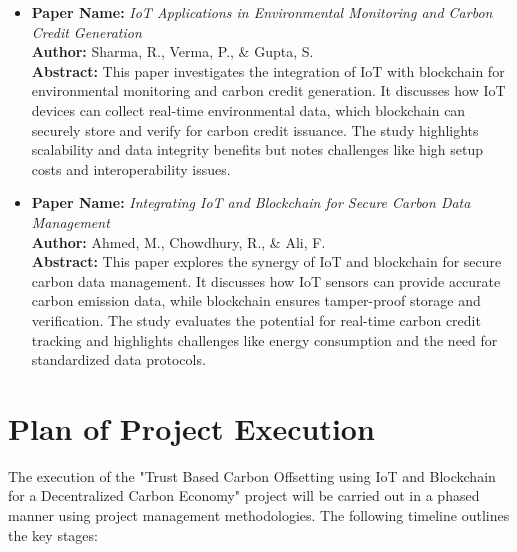 \documentclass[oneside,a4paper,12pt]{book}
\begin{document}
\begin{itemize}
  \item \textbf{Paper Name:} \textit{IoT Applications in Environmental Monitoring and Carbon Credit Generation} \\
        \textbf{Author:} Sharma, R., Verma, P., \& Gupta, S. \\
        \textbf{Abstract:} This paper investigates the integration of IoT with blockchain for environmental monitoring and carbon credit generation. It discusses how IoT devices can collect real-time environmental data, which blockchain can securely store and verify for carbon credit issuance. The study highlights scalability and data integrity benefits but notes challenges like high setup costs and interoperability issues.

  \item \textbf{Paper Name:} \textit{Integrating IoT and Blockchain for Secure Carbon Data Management} \\
        \textbf{Author:} Ahmed, M., Chowdhury, R., \& Ali, F. \\
        \textbf{Abstract:} This paper explores the synergy of IoT and blockchain for secure carbon data management. It discusses how IoT sensors can provide accurate carbon emission data, while blockchain ensures tamper-proof storage and verification. The study evaluates the potential for real-time carbon credit tracking and highlights challenges like energy consumption and the need for standardized data protocols.
\end{itemize}

\section{Plan of Project Execution}

The execution of the "Trust Based Carbon Offsetting using IoT and Blockchain for a Decentralized Carbon Economy" project will be carried out in a phased manner using project management methodologies. The following timeline outlines the key stages:
\end{document}
